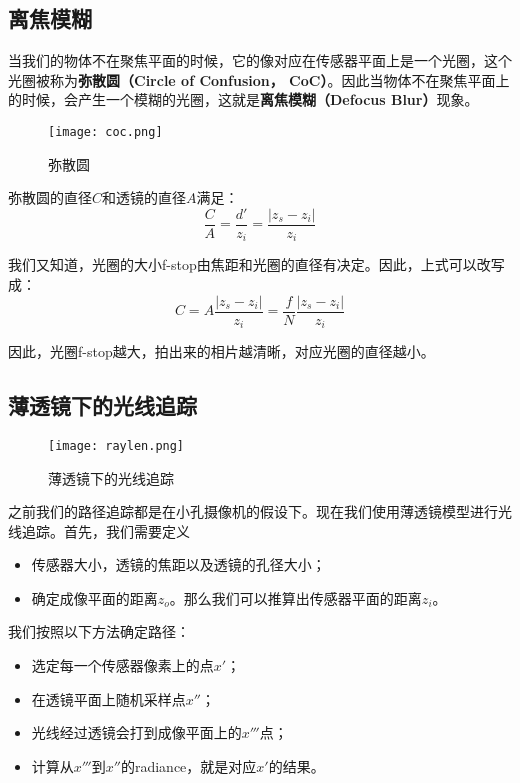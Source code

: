 \documentclass[openany]{progbookcn}
\begin{document}
\subsection{离焦模糊}

当我们的物体不在聚焦平面的时候，它的像对应在传感器平面上是一个光圈，这个光圈被称为\textbf{弥散圆（Circle of Confusion， CoC）}。因此当物体不在聚焦平面上的时候，会产生一个模糊的光圈，这就是\textbf{离焦模糊（Defocus Blur）}现象。

	\begin{figure}[H]
	\centering
	\texttt{[image: coc.png]}
	\caption{弥散圆}
	\label{fig:coc}
\end{figure}

弥散圆的直径$C$和透镜的直径$A$满足：
\begin{equation}
	\frac{C}{A}=\frac{d'}{z_i}=\frac{|z_s-z_i|}{z_i}
\end{equation}

我们又知道，光圈的大小f-stop由焦距和光圈的直径有决定。因此，上式可以改写成：
\begin{equation}
	C=A\frac{|z_s-z_i|}{z_i}=\frac{f}{N}\frac{|z_s-z_i|}{z_i}
\end{equation}

因此，光圈f-stop越大，拍出来的相片越清晰，对应光圈的直径越小。

\subsection{薄透镜下的光线追踪}

	\begin{figure}[H]
	\centering
	\texttt{[image: raylen.png]}
	\caption{薄透镜下的光线追踪}
	\label{fig:raylen}
	\end{figure}

之前我们的路径追踪都是在小孔摄像机的假设下。现在我们使用薄透镜模型进行光线追踪。首先，我们需要定义
\begin{itemize}
	\item 传感器大小，透镜的焦距以及透镜的孔径大小；
	\item 确定成像平面的距离$z_o$。那么我们可以推算出传感器平面的距离$z_i$。
\end{itemize}

我们按照以下方法确定路径：
\begin{itemize}
	\item 选定每一个传感器像素上的点$x'$；
	\item 在透镜平面上随机采样点$x''$；
	\item 光线经过透镜会打到成像平面上的$x'''$点；
	\item 计算从$x'''$到$x''$的radiance，就是对应$x'$的结果。
\end{itemize}
\end{document}

